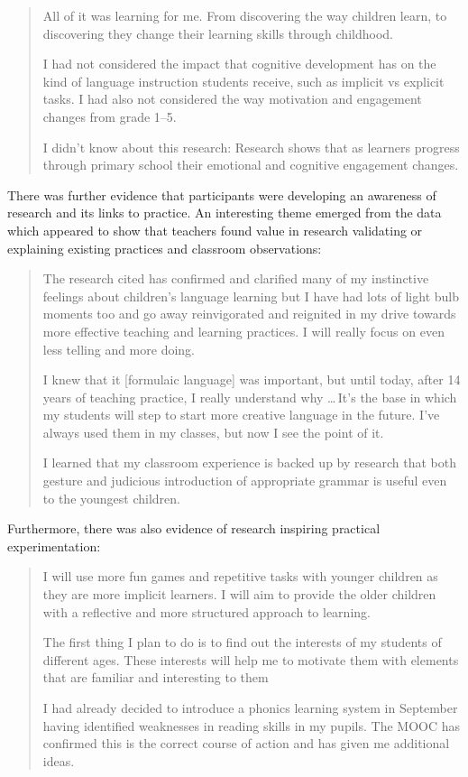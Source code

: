 \documentclass[output=paper]{langscibook}
\begin{document}
\begin{quote}
All of it was learning for me. From discovering the way children learn, to discovering they change their learning skills through childhood.

I had not considered the impact that cognitive development has on the kind of language instruction students receive, such as implicit vs explicit tasks. I had also not considered the way motivation and engagement changes from grade 1--5.

I didn't know about this research: Research shows that as learners progress through primary school their emotional and cognitive engagement changes.
\end{quote}

There was further evidence that participants were developing an awareness of research and its links to practice. An interesting theme emerged from the data which appeared to show that teachers found value in research validating or explaining existing practices and classroom observations:

\begin{quote}
The research cited has confirmed and clarified many of my instinctive feelings about children's language learning but I have had lots of light bulb moments too and go away reinvigorated and reignited in my drive towards more effective teaching and learning practices. I will really focus on even less telling and more doing.

I knew that it [formulaic language] was important, but until today, after 14 years of teaching practice, I really understand why \ldots\,It's the base in which my students will step to start more creative language in the future. I've always used them in my classes, but now I see the point of it.

I learned that my classroom experience is backed up by research that both gesture and judicious introduction of appropriate grammar is useful even to the youngest children.
\end{quote}

Furthermore, there was also evidence of research inspiring practical experimentation:

\begin{quote}
I will use more fun games and repetitive tasks with younger children as they are more implicit learners. I will aim to provide the older children with a reflective and more structured approach to learning.

The first thing I plan to do is to find out the interests of my students of different ages. These interests will help me to motivate them with elements that are familiar and interesting to them

I had already decided to introduce a phonics learning system in September having identified weaknesses in reading skills in my pupils. The MOOC has confirmed this is the correct course of action and has given me additional ideas.
\end{quote}
\end{document}
